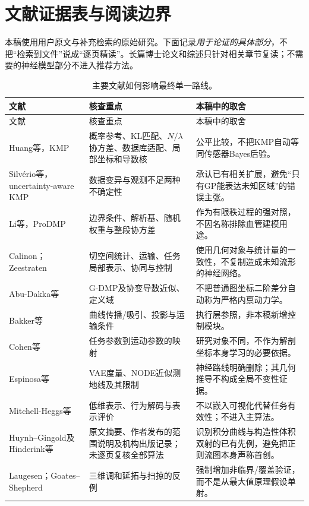 \documentclass[UTF8,11pt,a4paper,fontset=fandol]{ctexart}
\numberwithin{equation}{section}
\theoremstyle{plain}
\theoremstyle{definition}
\theoremstyle{remark}
\begin{document}
\section{文献证据表与阅读边界}\label{app:reading}
本稿使用用户原文与补充检索的原始研究。下面记录\emph{用于论证的具体部分}，不把“检索到文件”说成“逐页精读”。长篇博士论文和综述只针对相关章节复读；不需要的神经模型部分不进入推荐方法。
\small
\begin{longtable}{P{32mm}P{65mm}P{49mm}}
\caption{主要文献如何影响最终单一路线。}\\
\toprule 文献 & 核查重点 & 本稿中的取舍\\\midrule\endfirsthead
\toprule 文献 & 核查重点 & 本稿中的取舍\\\midrule\endhead
\bottomrule\endfoot
Huang等，KMP\cite{Huang2019} & 概率参考、KL匹配、$N/\lambda$协方差、数据库适配、局部坐标和导数核 & 公平比较，不把KMP自动等同传感器Bayes后验。\\
Silv\'erio等，uncertainty-aware KMP\cite{Silverio2019} & 数据变异与观测不足两种不确定性 & 承认已有相关扩展，避免“只有GP能表达未知区域”的错误主张。\\
Li等，ProDMP\cite{Li2022} & 边界条件、解析基、随机权重与整段协方差 & 作为有限秩过程的强对照，不因名称排除血管建模用途。\\
Calinon\cite{Calinon2020}；Zeestraten\cite{Zeestraten2017} & 切空间统计、运输、任务局部表示、协同与控制 & 使用几何对象与统计量的一致性，不复制造成未知流形的神经网络。\\
Abu-Dakka等\cite{AbuDakka2024} & G-DMP及协变导数近似、定义域 & 不把普通图坐标二阶差分自动称为严格内禀动力学。\\
Bakker等\cite{Bakker2026} & 曲线传播/吸引、投影与运输条件 & 执行层参照，非本稿新增控制模块。\\
Cohen等\cite{Cohen2021} & 任务参数到运动参数的映射 & 研究对象不同，不作为解剖坐标本身学习的必要依据。\\
Espinosa等\cite{Espinosa2026} & VAE度量、NODE近似测地线及其限制 & 神经路线明确删除；其几何推导不构成全局不变性证据。\\
Mitchell-Heggs等\cite{Mitchell2022} & 低维表示、行为解码与表示评价 & 不以嵌入可视化代替任务有效性；不进入主算法。\\
Huynh--Gingold及Hinderink等\cite{Huynh2015,Hinderink2023,Hinderink2024} & 原文摘要、作者发布的范围说明及机构出版记录；未逐页复核全部算法 & 识别积分曲线与构造性体积双射的已有先例，避免把正则流图本身声称首创。\\
Laugesen\cite{Laugesen1996}；Goates--Shepherd\cite{Goates2025} & 三维调和延拓与扫掠的反例 & 强制增加非临界/覆盖验证，而不是从最大值原理假设单射。\\

\end{longtable}
\end{document}
